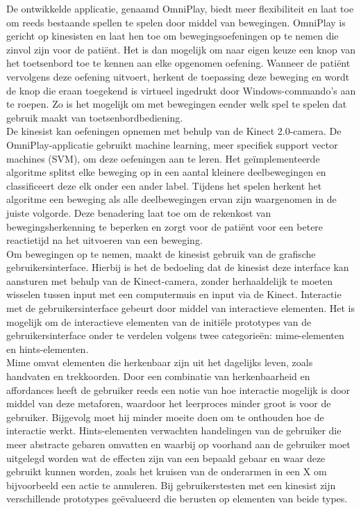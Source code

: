 De ontwikkelde applicatie, genaamd OmniPlay, biedt meer flexibiliteit en laat toe om reeds bestaande spellen te spelen door middel van bewegingen. OmniPlay is gericht op kinesisten en laat hen toe om bewegingsoefeningen op te nemen die zinvol zijn voor de pati\"ent. Het is dan mogelijk om naar eigen keuze een knop van het toetsenbord toe te kennen aan elke opgenomen oefening. Wanneer de pati\"ent vervolgens deze oefening uitvoert, herkent de toepassing deze beweging en wordt de knop die eraan toegekend is virtueel ingedrukt door Windows-commando's aan te roepen. Zo is het mogelijk om met bewegingen eender welk spel te spelen dat gebruik maakt van toetsenbordbediening.\\

De kinesist kan oefeningen opnemen met behulp van de Kinect 2.0-camera. De OmniPlay-applicatie gebruikt machine learning, meer specifiek support vector machines (SVM), om deze oefeningen aan te leren. Het ge\"implementeerde algoritme splitst elke beweging op in een aantal kleinere deelbewegingen en classificeert deze elk onder een ander label. Tijdens het spelen herkent het algoritme een beweging als alle deelbewegingen ervan zijn waargenomen in de juiste volgorde. Deze benadering laat toe om de rekenkost van bewegingsherkenning te beperken en zorgt voor de pati\"ent voor een betere reactietijd na het uitvoeren van een beweging.\\

Om bewegingen op te nemen, maakt de kinesist gebruik van de grafische gebruikersinterface. Hierbij is het de bedoeling dat de kinesist deze interface kan aansturen met behulp van de Kinect-camera, zonder herhaaldelijk te moeten wisselen tussen input met een computermuis en input via de Kinect. Interactie met de gebruikersinterface gebeurt door middel van interactieve elementen. Het is mogelijk om de interactieve elementen van de initi\"ele prototypes van de gebruikersinterface onder te verdelen volgens twee categorie\"en: mime-elementen en hints-elementen.\\

Mime omvat elementen die herkenbaar zijn uit het dagelijks leven, zoals handvaten en trekkoorden. Door een combinatie van herkenbaarheid en affordances heeft de gebruiker reeds een notie van hoe interactie mogelijk is door middel van deze metaforen, waardoor het leerproces minder groot is voor de gebruiker. Bijgevolg moet hij minder moeite doen om te onthouden hoe de interactie werkt. Hints-elementen verwachten handelingen van de gebruiker die meer abstracte gebaren omvatten en waarbij op voorhand aan de gebruiker moet uitgelegd worden wat de effecten zijn van een bepaald gebaar en waar deze gebruikt kunnen worden, zoals het kruisen van de onderarmen in een X om bijvoorbeeld een actie te annuleren. Bij gebruikerstesten met een kinesist zijn verschillende prototypes ge\"evalueerd die berusten op elementen van beide types.\\

